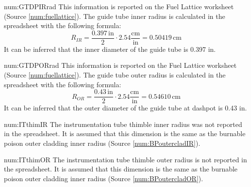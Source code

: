 \begin{numitem}{num:GTDPIRrad}
  This information is reported on the Fuel Lattice worksheet (Source \ref{num:fuellattice}). The guide tube inner radius is calculated in the spreadsheet with the following formula:
\[
    R_{IR} = \frac{0.397\,\mathrm{in}}{2}\cdot 2.54 \mathrm{\frac{cm}{in}} = 0.50419\,\mathrm{cm}
\]
  It can be inferred that the inner diameter of the guide tube is 0.397 in. 
  
\end{numitem}

\begin{numitem}{num:GTDPORrad}
  This information is reported on the Fuel Lattice worksheet (Source \ref{num:fuellattice}). The guide tube outer radius is calculated in the spreadsheet with the following formula:
\[
    R_{OR} = \frac{0.43\,\mathrm{in}}{2}\cdot 2.54 \mathrm{\frac{cm}{in}} = 0.54610\,\mathrm{cm}
\]
  It can be inferred that the outer diameter of the guide tube at dashpot is 0.43 in.
  
\end{numitem}

\begin{numitem}{num:ITthimIR}
  The instrumentation tube thimble inner radius was not reported in the spreadsheet. It is assumed that this dimension is the same as the burnable poison outer cladding inner radius (Source \ref{num:BPoutercladIR}).
\end{numitem}

\begin{numitem}{num:ITthimOR}
The instrumentation tube thimble outer radius is not reported in the spreadsheet. It is assumed that this dimension is the same as the burnable poison outer cladding inner radius (Source \ref{num:BPoutercladOR}).
  
\end{numitem}

